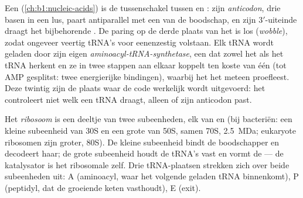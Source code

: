 \begin{definition}\label{def:b1:gene-expression:trna}
Een \emph{} (\cref{ch:b1:nucleic-acids}) is de tussenschakel tussen
 en : zijn \emph{anticodon}, drie basen in een lus, paart antiparallel
met een  van de boodschap, en zijn $3'$-uiteinde draagt het bijbehorende
. De paring op de derde plaats van het  is los (\emph{wobble}), zodat
ongeveer veertig tRNA's voor eenenzestig  volstaan. Elk tRNA wordt geladen
door zijn eigen \emph{aminoacyl-tRNA-synthetase}, een  dat zowel het 
als het tRNA herkent en ze in twee stappen aan elkaar koppelt ten koste van één 
(tot AMP gesplitst: twee energierijke bindingen), waarbij het het  meteen
proefleest. Deze twintig  zijn de plaats waar de code werkelijk wordt
uitgevoerd: het  controleert niet welk  een tRNA draagt, alleen of
zijn anticodon past.
\end{definition}

\begin{definition}\label{def:b1:gene-expression:ribosome}
Het \emph{ribosoom} is een deeltje van twee subeenheden, elk van  en
 (bij bacteriën: een kleine subeenheid van 30S en een grote van 50S, samen
70S, \qty{2.5}{MDa}; eukaryote ribosomen zijn groter, 80S). De kleine subeenheid
bindt de boodschapper en decodeert haar; de grote subeenheid houdt de tRNA's vast en
vormt de  --- de katalysator is het ribosomale  zelf. Drie
tRNA-plaatsen strekken zich over beide subeenheden uit: A (aminoacyl, waar het
volgende geladen tRNA binnenkomt), P (peptidyl, dat de groeiende keten vasthoudt),
E (exit).
\end{definition}

